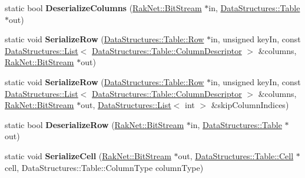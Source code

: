 \begin{DoxyCompactItemize}
\item 
\hypertarget{class_rak_net_1_1_table_serializer_ac2de551767322e3bf8ebe8501c1ca273}{static bool {\bfseries Deserialize\-Columns} (\hyperlink{class_rak_net_1_1_bit_stream}{Rak\-Net\-::\-Bit\-Stream} $\ast$in, \hyperlink{class_data_structures_1_1_table}{Data\-Structures\-::\-Table} $\ast$out)}\label{class_rak_net_1_1_table_serializer_ac2de551767322e3bf8ebe8501c1ca273}

\item 
\hypertarget{class_rak_net_1_1_table_serializer_a6260ee9fc0d7d638c3943005678fcd99}{static void {\bfseries Serialize\-Row} (\hyperlink{struct_data_structures_1_1_table_1_1_row}{Data\-Structures\-::\-Table\-::\-Row} $\ast$in, unsigned key\-In, const \hyperlink{class_data_structures_1_1_list}{Data\-Structures\-::\-List}$<$ \hyperlink{struct_data_structures_1_1_table_1_1_column_descriptor}{Data\-Structures\-::\-Table\-::\-Column\-Descriptor} $>$ \&columns, \hyperlink{class_rak_net_1_1_bit_stream}{Rak\-Net\-::\-Bit\-Stream} $\ast$out)}\label{class_rak_net_1_1_table_serializer_a6260ee9fc0d7d638c3943005678fcd99}

\item 
\hypertarget{class_rak_net_1_1_table_serializer_a98f3b7e7cb86b7881aa1e5181ea4aa4d}{static void {\bfseries Serialize\-Row} (\hyperlink{struct_data_structures_1_1_table_1_1_row}{Data\-Structures\-::\-Table\-::\-Row} $\ast$in, unsigned key\-In, const \hyperlink{class_data_structures_1_1_list}{Data\-Structures\-::\-List}$<$ \hyperlink{struct_data_structures_1_1_table_1_1_column_descriptor}{Data\-Structures\-::\-Table\-::\-Column\-Descriptor} $>$ \&columns, \hyperlink{class_rak_net_1_1_bit_stream}{Rak\-Net\-::\-Bit\-Stream} $\ast$out, \hyperlink{class_data_structures_1_1_list}{Data\-Structures\-::\-List}$<$ int $>$ \&skip\-Column\-Indices)}\label{class_rak_net_1_1_table_serializer_a98f3b7e7cb86b7881aa1e5181ea4aa4d}

\item 
\hypertarget{class_rak_net_1_1_table_serializer_aec5aedf00b2bd05cfc932127bf789ecb}{static bool {\bfseries Deserialize\-Row} (\hyperlink{class_rak_net_1_1_bit_stream}{Rak\-Net\-::\-Bit\-Stream} $\ast$in, \hyperlink{class_data_structures_1_1_table}{Data\-Structures\-::\-Table} $\ast$out)}\label{class_rak_net_1_1_table_serializer_aec5aedf00b2bd05cfc932127bf789ecb}

\item 
\hypertarget{class_rak_net_1_1_table_serializer_a2240902c22771d1fc0d3425e78d13c36}{static void {\bfseries Serialize\-Cell} (\hyperlink{class_rak_net_1_1_bit_stream}{Rak\-Net\-::\-Bit\-Stream} $\ast$out, \hyperlink{struct_data_structures_1_1_table_1_1_cell}{Data\-Structures\-::\-Table\-::\-Cell} $\ast$cell, Data\-Structures\-::\-Table\-::\-Column\-Type column\-Type)}\label{class_rak_net_1_1_table_serializer_a2240902c22771d1fc0d3425e78d13c36}


\end{DoxyCompactItemize}
